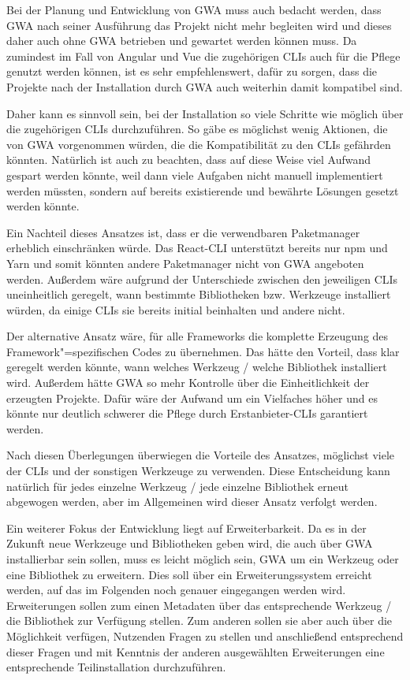 Bei der Planung und Entwicklung von \gls{GWA} muss auch bedacht werden, dass \gls{GWA} nach seiner Ausführung das Projekt nicht mehr begleiten wird und dieses daher auch ohne \gls{GWA} betrieben und gewartet werden können muss. Da zumindest im Fall von Angular und Vue die zugehörigen \gls{CLI}s auch für die Pflege genutzt werden können, ist es sehr empfehlenswert, dafür zu sorgen, dass die Projekte nach der Installation durch \gls{GWA} auch weiterhin damit kompatibel sind.

\label{decision_use_clis}
Daher kann es sinnvoll sein, bei der Installation so viele Schritte wie möglich über die zugehörigen \gls{CLI}s durchzuführen. So gäbe es möglichst wenig Aktionen, die von \gls{GWA} vorgenommen würden, die die Kompatibilität zu den \gls{CLI}s gefährden könnten. Natürlich ist auch zu beachten, dass auf diese Weise viel Aufwand gespart werden könnte, weil dann viele Aufgaben nicht manuell implementiert werden müssten, sondern auf bereits existierende und bewährte Lösungen gesetzt werden könnte.

Ein Nachteil dieses Ansatzes ist, dass er die verwendbaren Paketmanager erheblich einschränken würde. Das React-\gls{CLI} unterstützt bereits nur \gls{npm} und Yarn \cite{cra_package_managers} und somit könnten andere Paketmanager nicht von \gls{GWA} angeboten werden. Außerdem wäre aufgrund der Unterschiede zwischen den jeweiligen \gls{CLI}s uneinheitlich geregelt, wann bestimmte Bibliotheken bzw. Werkzeuge installiert würden, da einige \gls{CLI}s sie bereits initial beinhalten und andere nicht.

Der alternative Ansatz wäre, für alle Frameworks die komplette Erzeugung des Framework"=spezifischen Codes zu übernehmen. Das hätte den Vorteil, dass klar geregelt werden könnte, wann welches Werkzeug / welche Bibliothek installiert wird. Außerdem hätte \gls{GWA} so mehr Kontrolle über die Einheitlichkeit der erzeugten Projekte. Dafür wäre der Aufwand um ein Vielfaches höher und es könnte nur deutlich schwerer die Pflege durch Erstanbieter-\gls{CLI}s garantiert werden.

Nach diesen Überlegungen überwiegen die Vorteile des Ansatzes, möglichst viele der \gls{CLI}s und der sonstigen Werkzeuge zu verwenden. Diese Entscheidung kann natürlich für jedes einzelne Werkzeug / jede einzelne Bibliothek erneut abgewogen werden, aber im Allgemeinen wird dieser Ansatz verfolgt werden.

Ein weiterer Fokus der Entwicklung liegt auf Erweiterbarkeit. Da es in der Zukunft neue Werkzeuge und Bibliotheken geben wird, die auch über \gls{GWA} installierbar sein sollen, muss es leicht möglich sein, \gls{GWA} um ein Werkzeug oder eine Bibliothek zu erweitern. Dies soll über ein Erweiterungssystem erreicht werden, auf das im Folgenden noch genauer eingegangen werden wird. Erweiterungen sollen zum einen Metadaten über das entsprechende Werkzeug / die Bibliothek zur Verfügung stellen. Zum anderen sollen sie aber auch über die Möglichkeit verfügen, Nutzenden Fragen zu stellen und anschließend entsprechend dieser Fragen und mit Kenntnis der anderen ausgewählten Erweiterungen eine entsprechende Teilinstallation durchzuführen.

